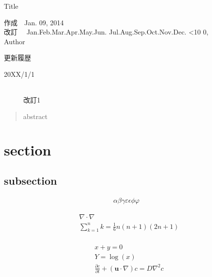 \documentclass[a4paper,fleqn]{jsarticle}
\def\today{%
  \ifcase\month\or
                Jan.\or Feb.\or Mar.\or Apr.\or May.\or Jun.\or
                Jul.\or Aug.\or Sep.\or Oct.\or Nov.\or Dec.
  		\fi\hspace{0.0em} 
  \ifnum\day<10 0\fi\the\day, 
  \the\year%
}
\begin{document}
\thispagestyle{plain}
\begin{flushleft}
\begin{Large}
Title
\end{Large}
\end{flushleft}

\begin{flushright}
作成　Jan. 09, 2014\\
改訂　\today\\
Author
\end{flushright}

\begin{flushleft}
更新履歴
\end{flushleft}
\begin{description}
 \item[20XX/1/1]\mbox{}\\ 
	    改訂1
\end{description}

\begin{abstract}
 abstract
\end{abstract}

\hrulefill



\section{section}

\subsection{subsection}
\begin{align*}
\alpha \beta \gamma \varepsilon \epsilon \phi \varphi
\end{align*}

\begin{align}
&\nabla \cdot\nabla  \\
&\sum^{n}_{k=1} k =\frac{1}{6}n(n+1)(2n+1) \\
\end{align}

\begin{align}
& x+y=0 \\
&Y=\log(x)\\
&\frac{\partial c}{\partial t} +(\bm{u}\cdot \nabla )c=D\nabla ^2 c
 \end{align}
\end{document}
